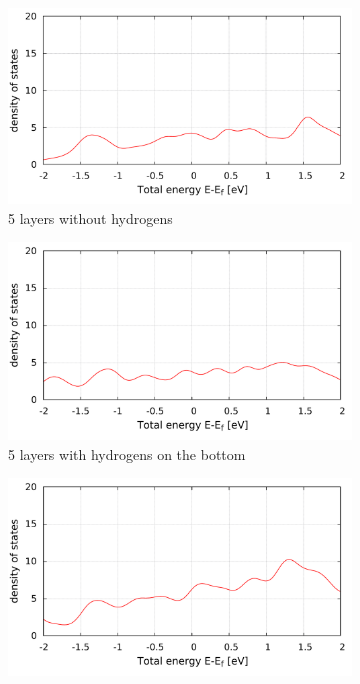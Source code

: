 	\begin{figure}[tbp]
		\begin{subfigure}[c]{.48\linewidth}
			\centering
			\includegraphics[width=\linewidth]{Hg_termination/no_H_DOS_5_layers_-2_2.pdf}
			\caption{5 layers without hydrogens}
		\end{subfigure}
		\hfill
		\begin{subfigure}[c]{.48\linewidth}
			\centering
			\includegraphics[width=\linewidth]{Hg_termination/DOS_5_layers_-2_2.pdf}
			\caption{5 layers with hydrogens on the bottom}
		\end{subfigure}
		\begin{subfigure}[c]{.48\linewidth}
			\centering
			\includegraphics[width=\linewidth]{Hg_termination/no_H_DOS_9_layers_-2_2.pdf}

\end{subfigure}
\end{figure}
